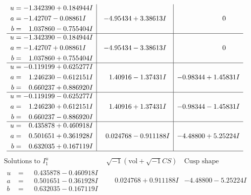 \documentclass[1p]{elsarticle_modified}
\theoremstyle{definition}
\newcommand{\I}{\sqrt{-1}}
\begin{document}
$$\begin{array}{c|c|c}
\begin{aligned}
u &= -1.342390 + 0.184944 I \\
a &= -1.42707 - 0.08861 I \\
b &= \phantom{-}1.037860 - 0.755404 I\end{aligned}
 & -4.95434 + 3.38613 I & \phantom{-0.000000 } 0 \\ \hline\begin{aligned}
u &= -1.342390 - 0.184944 I \\
a &= -1.42707 + 0.08861 I \\
b &= \phantom{-}1.037860 + 0.755404 I\end{aligned}
 & -4.95434 - 3.38613 I & \phantom{-0.000000 } 0 \\ \hline\begin{aligned}
u &= -0.119199 + 0.625277 I \\
a &= \phantom{-}1.246230 - 0.612151 I \\
b &= \phantom{-}0.660237 + 0.886920 I\end{aligned}
 & \phantom{-}1.40916 - 1.37431 I & -0.98344 + 1.45831 I \\ \hline\begin{aligned}
u &= -0.119199 - 0.625277 I \\
a &= \phantom{-}1.246230 + 0.612151 I \\
b &= \phantom{-}0.660237 - 0.886920 I\end{aligned}
 & \phantom{-}1.40916 + 1.37431 I & -0.98344 - 1.45831 I \\ \hline\begin{aligned}
u &= \phantom{-}0.435878 + 0.460918 I \\
a &= \phantom{-}0.501651 + 0.361928 I \\
b &= \phantom{-}0.632035 + 0.167119 I\end{aligned}
 & \phantom{-}0.024768 - 0.911188 I & -4.48800 + 5.25224 I\\
 \hline 
 \end{array}$$\newpage$$\begin{array}{c|c|c}  
\text{Solutions to }I^u_{1}& \I (\text{vol} + \sqrt{-1}CS) & \text{Cusp shape}\\
 \hline 
\begin{aligned}
u &= \phantom{-}0.435878 - 0.460918 I \\
a &= \phantom{-}0.501651 - 0.361928 I \\
b &= \phantom{-}0.632035 - 0.167119 I\end{aligned}
 & \phantom{-}0.024768 + 0.911188 I & -4.48800 - 5.25224 I \\ \hline\begin{aligned}

\end{aligned}
\end{array}$$
\end{document}
